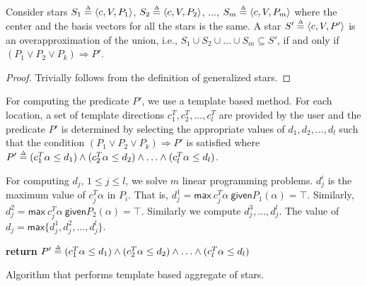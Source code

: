 \begin{lemma}
\label{lem:agg}
Consider stars $S_1 \deq \tup{c, V, P_1}$, $S_2 \deq \tup{c, V, P_2}$, $\ldots$, $S_m \deq \tup{c, V, P_m}$ where the center and the basis vectors for all the stars is the same.
%
A star $S' \deq \tup{c, V, P'}$ is an overapproximation of the union, i.e., $S_1 \cup S_2 \cup \ldots \cup S_m \subseteq S'$, if and only if $(P_1 \vee P_2 \vee P_k) \Rightarrow P'$.
\end{lemma}
\begin{proof}
Trivially follows from the definition of generalized stars.
\end{proof}

 For computing the predicate $P'$, we use a template based method.
%
%
For each location, a set of template directions $c_1^{T}, c_2^{T}, \ldots, c_{l}^{T}$ are provided by the user and the predicate $P'$ is determined by selecting the appropriate values of $d_1, d_2, \ldots, d_l$ such that the condition $(P_1 \vee P_2 \vee P_k) \Rightarrow P'$ is satisfied where $P' \mathrel{\stackrel{\scriptscriptstyle\Delta}{=}} (c_1^{T}\alpha \leq d_1) \wedge (c_2^{T}\alpha \leq d_2) \wedge \ldots \wedge (c_l^{T}\alpha \leq d_l)$. 

For computing $d_j$, $1 \leq j \leq l$, we solve $m$ linear programming problems. $d_j^i$ is the maximum value of $c_j^T \alpha$ in $P_i$. That is, $d_j^1 = \mathsf{max}~ c_j^T \alpha~ \mathsf{given} P_1(\alpha) = \top$. Similarly, $d_j^2 = \mathsf{max}~ c_j^T \alpha~ \mathsf{given} P_2(\alpha) = \top$. Similarly we compute $d_j^3, \ldots, d_j^l$. The value of $d_j = \mathsf{max} \{d_j^1, d_j^2, \ldots, d_j^l\}$.

\vspace{-0.6cm}
\begin{algorithm}[h!]

{\bf return} $P' \mathrel{\stackrel{\scriptscriptstyle\Delta}{=}} (c_1^T \alpha \leq d_1) \wedge (c_2^T \alpha \leq d_2) \wedge \ldots \wedge (c_l^{T} \alpha \leq d_l)$\;
\caption{Algorithm that performs template based aggregate of stars.}
\label{alg:aggTemplate}
\end{algorithm}
\vspace{-0.8cm}

